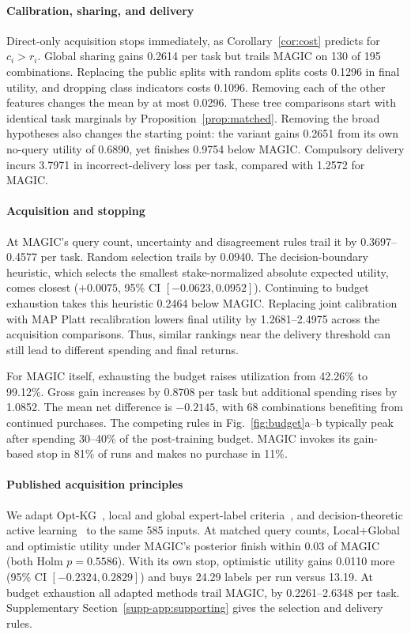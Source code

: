 \documentclass[journal]{IEEEtran}
\begin{document}
\paragraph{Calibration, sharing, and delivery}
Direct-only acquisition stops immediately, as Corollary~\ref{cor:cost} predicts for $c_i>r_i$. Global sharing gains 0.2614 per task but trails MAGIC on 130 of 195 combinations. Replacing the public splits with random splits costs 0.1296 in final utility, and dropping class indicators costs 0.1096. Removing each of the other features changes the mean by at most 0.0296. These tree comparisons start with identical task marginals by Proposition~\ref{prop:matched}. Removing the broad hypotheses also changes the starting point: the variant gains 0.2651 from its own no-query utility of 0.6890, yet finishes 0.9754 below MAGIC. Compulsory delivery incurs 3.7971 in incorrect-delivery loss per task, compared with 1.2572 for MAGIC.

\paragraph{Acquisition and stopping}
At MAGIC's query count, uncertainty and disagreement rules trail it by 0.3697--0.4577 per task. Random selection trails by 0.0940. The decision-boundary heuristic, which selects the smallest stake-normalized absolute expected utility, comes closest ($+0.0075$, 95\% CI $[-0.0623,0.0952]$). Continuing to budget exhaustion takes this heuristic 0.2464 below MAGIC. Replacing joint calibration with MAP Platt recalibration lowers final utility by 1.2681--2.4975 across the acquisition comparisons. Thus, similar rankings near the delivery threshold can still lead to different spending and final returns.

For MAGIC itself, exhausting the budget raises utilization from 42.26\% to 99.12\%. Gross gain increases by 0.8708 per task but additional spending rises by 1.0852. The mean net difference is $-0.2145$, with 68 combinations benefiting from continued purchases. The competing rules in Fig.~\ref{fig:budget}a--b typically peak after spending 30--40\% of the post-training budget. MAGIC invokes its gain-based stop in 81\% of runs and makes no purchase in 11\%.

\paragraph{Published acquisition principles}
We adapt Opt-KG~\cite{chen2013optimistic}, local and global expert-label criteria~\cite{liu2015boosting}, and decision-theoretic active learning~\cite{kapoor2007selective} to the same 585 inputs. At matched query counts, Local+Global and optimistic utility under MAGIC's posterior finish within 0.03 of MAGIC (both Holm $p=0.5586$). With its own stop, optimistic utility gains 0.0110 more (95\% CI $[-0.2324,0.2829]$) and buys 24.29 labels per run versus 13.19. At budget exhaustion all adapted methods trail MAGIC, by 0.2261--2.6348 per task. Supplementary Section~\ref{supp-app:supporting} gives the selection and delivery rules.
\end{document}

